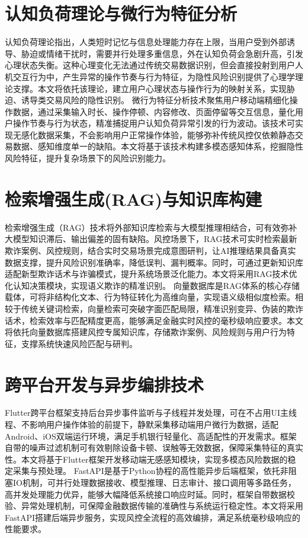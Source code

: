 \documentclass[twoside,openright]{xduugthesis}
\begin{document}
\section{认知负荷理论与微行为特征分析}
认知负荷理论指出，人类短时记忆与信息处理能力存在上限，当用户受到外部诱导、胁迫或情绪干扰时，需要并行处理多重信息，外在认知负荷会急剧升高，引发心理状态失衡\cite{ibraheem2025duress}。这种心理变化无法通过传统交易数据识别，但会直接投射到用户人机交互行为中，产生异常的操作节奏与行为特征，为隐性风险识别提供了心理学理论支撑。本文将依托该理论，建立用户心理状态与操作行为的映射关系，实现胁迫、诱导类交易风险的隐性识别。
微行为特征分析技术聚焦用户移动端精细化操作数据，通过采集输入时长、操作停顿、内容修改、页面停留等交互信息，量化用户操作节奏与行为状态，精准捕捉用户认知负荷异常引发的行为波动\cite{li2024cognitive}。该技术可实现无感化数据采集，不会影响用户正常操作体验，能够弥补传统风控仅依赖静态交易数据、感知维度单一的缺陷。本文将基于该技术构建多模态感知体系，挖掘隐性风险特征，提升复杂场景下的风险识别能力。

\section{检索增强生成(RAG)与知识库构建}
检索增强生成（RAG）技术将外部知识库检索与大模型推理相结合，可有效弥补大模型知识滞后、输出偏差的固有缺陷\cite{srinivasan2025rag}。风控场景下，RAG技术可实时检索最新欺诈案例、风控规则，结合实时交易场景完成意图研判，让AI推理结果具备真实数据支撑，提升风险识别准确率，降低误判、漏判概率。同时，可通过更新知识库适配新型欺诈话术与诈骗模式，提升系统场景泛化能力。本文将采用RAG技术优化认知决策模块，实现语义欺诈的精准识别。
向量数据库是RAG体系的核心存储载体，可将非结构化文本、行为特征转化为高维向量，实现语义级相似度检索。相较于传统关键词检索，向量检索可突破字面匹配局限，精准识别变异、伪装的欺诈话术，检索效率与匹配精度更高，能够满足金融实时风控的毫秒级响应要求。本文将依托向量数据库搭建风控专属知识库，存储欺诈案例、风险规则与用户行为特征，支撑系统快速风险匹配与研判。

\section{跨平台开发与异步编排技术}
Flutter跨平台框架支持后台异步事件监听与子线程并发处理，可在不占用UI主线程、不影响用户操作体验的前提下，静默采集移动端用户微行为数据，适配Android、iOS双端运行环境，满足手机银行轻量化、高适配性的开发需求。框架自带的噪声过滤机制可有效剔除设备卡顿、误触等无效数据，保障采集特征的真实性。本文将基于Flutter框架开发移动端无感感知模块，实现多模态风险数据的稳定采集与预处理。
FastAPI是基于Python协程的高性能异步后端框架，依托非阻塞IO机制，可并行处理数据接收、模型推理、日志审计、接口调用等多路任务，高并发处理能力优异，能够大幅降低系统接口响应时延。同时，框架自带数据校验、异常处理机制，可保障金融数据传输的准确性与系统运行稳定性。本文将采用FastAPI搭建后端异步服务，实现风控全流程的高效编排，满足系统毫秒级响应的性能要求。
\end{document}
